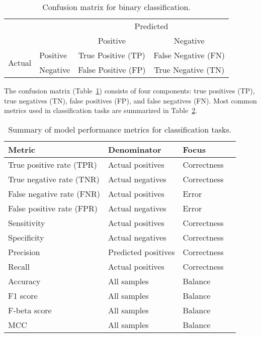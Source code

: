 \begin{table}[H]
    \caption{Confusion matrix for binary classification.}
    \centering
    \begin{tabular}{ll|cc}
        \toprule
        \multicolumn{2}{c|}{\multirow{2}{*}{}} & \multicolumn{2}{c}{Predicted} \\
        \multicolumn{2}{c|}{} & Positive & Negative \\
        \midrule
        \multirow{2}{*}{Actual} & Positive & True Positive (TP) & False Negative (FN) \\
        & Negative & False Positive (FP) & True Negative (TN) \\
        \bottomrule
    \end{tabular}
    \label{tab:confusion-matrix}
\end{table}


The confusion matrix (Table~\ref{tab:confusion-matrix}) consists of four components: true positives (TP), true negatives (TN), false positives (FP), and false negatives (FN). Most common metrics used in classification tasks are summarized in Table~\ref{tab:metrics-cls}.

\begin{table}[H]
    \caption{Summary of model performance metrics for classification tasks.}
    \centering
    \begin{tabular}{llll}
        \toprule
        Metric & Denominator & Focus \\
        \midrule
        True positive rate (TPR) & Actual positives & Correctness \\
        True negative rate (TNR) & Actual negatives & Correctness \\
        False negative rate (FNR) & Actual positives & Error \\
        False positive rate (FPR) & Actual negatives & Error \\
        \midrule
        Sensitivity & Actual positives & Correctness \\
        Specificity & Actual negatives & Correctness \\
        \midrule
        Precision & Predicted positives & Correctness \\
        Recall & Actual positives & Correctness \\
        \midrule
        Accuracy & All samples & Balance \\
        F1 score & All samples & Balance \\
        F-beta score & All samples & Balance \\
        MCC & All samples & Balance \\
        \bottomrule
    \end{tabular}
    \label{tab:metrics-cls}
\end{table}

